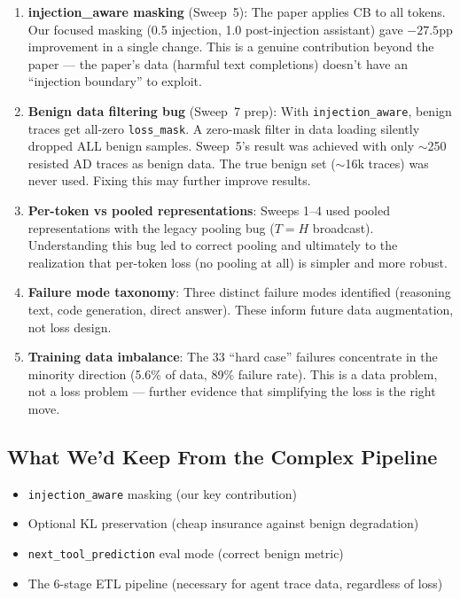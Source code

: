 \documentclass[11pt]{article}
\begin{document}
\begin{enumerate}
  \item \textbf{injection\_aware masking} (Sweep~5): The paper applies CB to all
        tokens. Our focused masking (0.5 injection, 1.0 post-injection
        assistant) gave $-27.5$pp improvement in a single change. This is a
        genuine contribution beyond the paper --- the paper's data (harmful text
        completions) doesn't have an ``injection boundary'' to exploit.

  \item \textbf{Benign data filtering bug} (Sweep~7 prep): With
        \texttt{injection\_aware}, benign traces get all-zero \texttt{loss\_mask}.
        A zero-mask filter in data loading silently dropped ALL benign samples.
        Sweep~5's result was achieved with only $\sim$250 resisted AD traces
        as benign data. The true benign set ($\sim$16k traces) was never used.
        Fixing this may further improve results.

  \item \textbf{Per-token vs pooled representations}: Sweeps 1--4 used pooled
        representations with the legacy pooling bug ($T=H$ broadcast).
        Understanding this bug led to correct pooling and ultimately to the
        realization that per-token loss (no pooling at all) is simpler and
        more robust.

  \item \textbf{Failure mode taxonomy}: Three distinct failure modes identified
        (reasoning text, code generation, direct answer). These inform future
        data augmentation, not loss design.

  \item \textbf{Training data imbalance}: The 33 ``hard case'' failures
        concentrate in the minority direction (5.6\% of data, 89\% failure
        rate). This is a data problem, not a loss problem --- further evidence
        that simplifying the loss is the right move.
\end{enumerate}

\subsection{What We'd Keep From the Complex Pipeline}

\begin{itemize}
  \item \texttt{injection\_aware} masking (our key contribution)
  \item Optional KL preservation (cheap insurance against benign degradation)
  \item \texttt{next\_tool\_prediction} eval mode (correct benign metric)
  \item The 6-stage ETL pipeline (necessary for agent trace data, regardless of loss)
\end{itemize}
\end{document}
